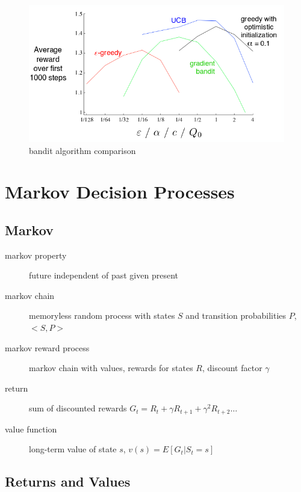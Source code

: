 \documentclass[]{article}
\theoremstyle{definition}
\begin{document}
\begin{figure}[ht]
    \centering
    \includegraphics[width=0.7\linewidth]{bandit_comparison.png}
    \caption{bandit algorithm comparison}
    \label{fig:bandit-comparison}
\end{figure}

\section{Markov Decision Processes}
\label{sec:markov_decision_processes}

\subsection{Markov}
\label{sub:markov}

\begin{description}
    \item[markov property] future independent of past given present
    \item[markov chain] memoryless random process with states $S$ and transition probabilities $P$, $<S,P>$

    \item[markov reward process] markov chain with values, rewards for states $R$, discount factor $\gamma$
    \item[return] sum of discounted rewards $G_t = R_t + \gamma R_{t+1} + \gamma^2 R_{t+2} \ldots$
    \item[value function] long-term value of state $s$, $v(s) = E[G_t | S_t = s]$
\end{description}

\subsection{Returns and Values}
\label{sub:returns_and_values}

\begin{description}
\end{description}
\end{document}
